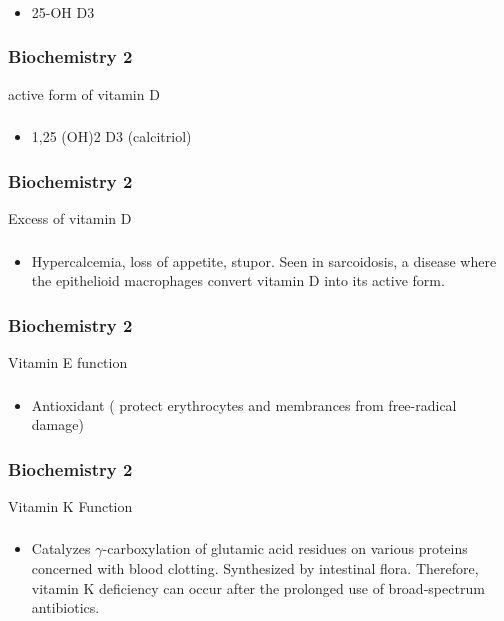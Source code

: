 \documentclass[11pt]{beamer}
\begin{document}
\begin{frame}
 \frametitle{}
\begin{itemize}
\item 25-OH D3 
\end{itemize}
\end{frame}

\begin{frame}
 \frametitle{Biochemistry 2}
active form of vitamin D 
\end{frame}

\begin{frame}
 \frametitle{}
\begin{itemize}
\item 1,25 (OH)2 D3 (calcitriol)
\end{itemize}
\end{frame}

\begin{frame}
 \frametitle{Biochemistry 2}
Excess of vitamin D 
\end{frame}

\begin{frame}
 \frametitle{}
\begin{itemize}
\item Hypercalcemia, loss of appetite, stupor. Seen in sarcoidosis, a disease where the epithelioid macrophages convert vitamin D into its active form.
\end{itemize}
\end{frame}

\begin{frame}
 \frametitle{Biochemistry 2}
Vitamin E function 
\end{frame}

\begin{frame}
 \frametitle{}
\begin{itemize}
\item Antioxidant ( protect erythrocytes and membrances from free-radical damage) 
\end{itemize}
\end{frame}

\begin{frame}
 \frametitle{Biochemistry 2}
Vitamin K Function
\end{frame}

\begin{frame}
 \frametitle{}
\begin{itemize}
\item Catalyzes ${\gamma}$-carboxylation of glutamic acid residues on various proteins concerned with blood clotting. Synthesized by intestinal flora. Therefore, vitamin K deficiency can occur after the prolonged use of broad-spectrum antibiotics.
\end{itemize}
\end{frame}
\end{document}
